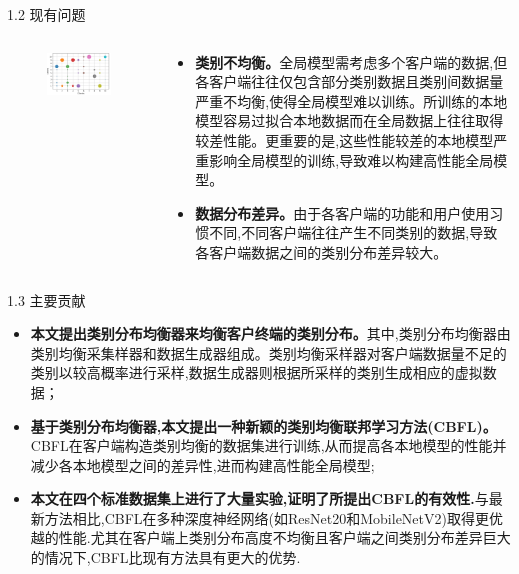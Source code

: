 \documentclass{sintefbeamer}
\theoremstyle{definition}
\begin{document}
\begin{frame}{1.2 现有问题}
\begin{columns}
\begin{column}{0.45\textwidth}
\begin{figure}[ht]
\centering
\includegraphics[width=1\textwidth]{images/img_unbalance}
\end{figure}
\end{column}
\begin{column}{0.65\textwidth}
\begin{itemize}
\item \textbf{类别不均衡。}全局模型需考虑多个客户端的数据,但各客户端往往仅包含部分类别数据且类别间数据量严重不均衡,使得全局模型难以训练。所训练的本地模型容易过拟合本地数据而在全局数据上往往取得较差性能。更重要的是,这些性能较差的本地模型严重影响全局模型的训练,导致难以构建高性能全局模型。
\item \textbf{数据分布差异。}由于各客户端的功能和用户使用习惯不同,不同客户端往往产生不同类别的数据,导致各客户端数据之间的类别分布差异较大。
\end{itemize}
\end{column}
\end{columns}
\end{frame}


\begin{frame}{1.3 主要贡献}
\begin{itemize}
\item \textbf{本文提出类别分布均衡器来均衡客户终端的类别分布。}其中,类别分布均衡器由类别均衡采集样器和数据生成器组成。类别均衡采样器对客户端数据量不足的类别以较高概率进行采样,数据生成器则根据所采样的类别生成相应的虚拟数据；
\item \textbf{基于类别分布均衡器,本文提出一种新颖的类别均衡联邦学习方法(CBFL)。}CBFL在客户端构造类别均衡的数据集进行训练,从而提高各本地模型的性能并减少各本地模型之间的差异性,进而构建高性能全局模型;
\item \textbf{本文在四个标准数据集上进行了大量实验,证明了所提出CBFL的有效性.}与最新方法相比,CBFL在多种深度神经网络(如ResNet20和MobileNetV2)取得更优越的性能.尤其在客户端上类别分布高度不均衡且客户端之间类别分布差异巨大的情况下,CBFL比现有方法具有更大的优势.
\end{itemize}
\end{frame}
\end{document}
